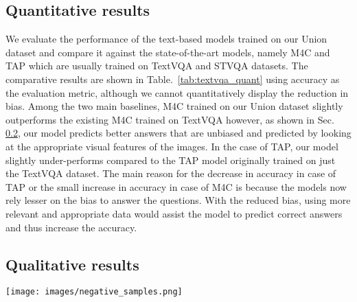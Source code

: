 \documentclass[10pt,twocolumn,letterpaper]{article}
\begin{document}
\subsection{Quantitative results}
\label{subsec:quan_res}

We evaluate the performance of the text-based models trained on our Union dataset and compare it against the state-of-the-art models, namely M4C and TAP which are usually trained on TextVQA and STVQA datasets. The comparative results are shown in Table.~\ref{tab:textvqa_quant} using accuracy as the evaluation metric, although we cannot quantitatively display the reduction in bias.
Among the two main baselines, M4C trained on our Union dataset slightly outperforms the existing M4C trained on TextVQA however, as shown in Sec. \ref{subsec:qual_res}, our model predicts better answers that are unbiased and predicted by looking at the appropriate visual features of the images.
In the case of TAP, our model slightly under-performs compared to the TAP model originally trained on just the TextVQA dataset.
The main reason for the decrease in accuracy in case of TAP or the small increase in accuracy in case of M4C is because the models now rely lesser on the bias to answer the questions. With the reduced bias, using more relevant and appropriate data would assist the model to predict correct answers and thus increase the accuracy.


\subsection{Qualitative results}
\label{subsec:qual_res}


\begin{figure*}[!htb]
    \centering
    \texttt{[image: images/negative\_samples.png]}
    \caption{Ground Truth Limitations: In a few cases the dataset contains ambiguous answers such as the first case where the number of km's on the sad sign is asked, but the ground truth answer provided is \textit{1, 2, 3} which is incorrect. }
    \label{fig:negative_samples}
\end{figure*}
\end{document}
